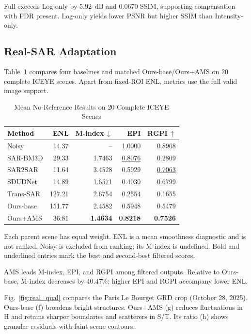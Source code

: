 \documentclass[journal]{IEEEtran}
\newcommand{\rev}[1]{{\color{RevisionBlue}#1}}
\newcommand{\condensed}[1]{{\color{CondensedGreen}#1}}
\newcommand{\rev}[1]{#1}
\newcommand{\condensed}[1]{#1}
\begin{document}
\condensed{Full exceeds Log-only by \rev{5.92~dB} and 0.0670 SSIM, supporting compensation with FDR present. Log-only yields lower PSNR but higher SSIM than Intensity-only.}

\subsection{Real-SAR Adaptation}
\rev{Table~\ref{tab:real} compares four baselines and matched Ours-base/Ours+AMS on 20 complete ICEYE scenes. Apart from fixed-ROI ENL, metrics use the full valid image support.}

\begin{table}[!t]
\caption{\rev{Mean No-Reference Results on 20 Complete ICEYE Scenes}}
\label{tab:real}
\centering
\footnotesize
\setlength{\tabcolsep}{2.5pt}
\renewcommand{\arraystretch}{1.04}
\rev{\begin{tabular*}{\columnwidth}{@{\extracolsep{\fill}}lrrrr@{}}
\toprule
\textbf{Method} & \textbf{ENL} & \textbf{M-index}\,$\downarrow$ & \textbf{EPI} & \textbf{RGPI}\,$\uparrow$ \\
\midrule
Noisy & 14.37 & -- & 1.0000 & 0.8968 \\
SAR-BM3D & 29.33 & 1.7463 & \underline{0.8076} & 0.2809 \\
SAR2SAR & 11.64 & 3.4528 & 0.5929 & \underline{0.7063} \\
SDUDNet & 14.89 & \underline{1.6571} & 0.4030 & 0.6799 \\
Trans-SAR & 127.21 & 2.6754 & 0.2554 & 0.1655 \\
Ours-base & 151.77 & 2.4582 & 0.5948 & 0.5479 \\
Ours+AMS & 36.81 & \textbf{1.4634} & \textbf{0.8218} & \textbf{0.7526} \\
\bottomrule
\end{tabular*}}
\vspace{1pt}
\parbox{\columnwidth}{\footnotesize\rev{Each parent scene has equal weight. ENL is a mean smoothness diagnostic and is not ranked. Noisy is excluded from ranking; its M-index is undefined. Bold and underlined entries mark the best and second-best filtered scores.}}
\end{table}

\rev{AMS leads M-index, EPI, and RGPI among filtered outputs. Relative to Ours-base, M-index decreases by 40.47\%; higher EPI and RGPI accompany lower ENL.}

\rev{Fig.~\ref{fig:real_qual} compares the Paris Le Bourget GRD crop (October 28, 2025). Ours-base (f) broadens bright structures. Ours+AMS (g) reduces fluctuations in H and retains sharper boundaries and scatterers in S/T. Its ratio (h) shows granular residuals with faint scene contours.}
\end{document}
